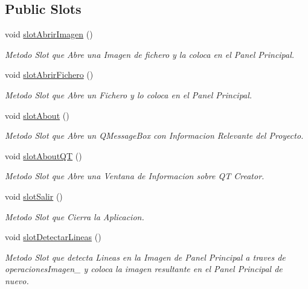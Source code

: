 \subsection*{Public Slots}
\begin{DoxyCompactItemize}
\item 
void \hyperlink{classCAplicacion_ab51359b6a7881206fe6ac46e0ca982f3}{slot\+Abrir\+Imagen} ()
\begin{DoxyCompactList}\small\item\em Metodo Slot que Abre una Imagen de fichero y la coloca en el Panel Principal. \end{DoxyCompactList}\item 
void \hyperlink{classCAplicacion_a3e11d14b05a911fd2e5f5da768787ac2}{slot\+Abrir\+Fichero} ()
\begin{DoxyCompactList}\small\item\em Metodo Slot que Abre un Fichero y lo coloca en el Panel Principal. \end{DoxyCompactList}\item 
void \hyperlink{classCAplicacion_a9ac9b20ed3bd1f2750ee7649ad899f79}{slot\+About} ()
\begin{DoxyCompactList}\small\item\em Metodo Slot que Abre un Q\+Message\+Box con Informacion Relevante del Proyecto. \end{DoxyCompactList}\item 
void \hyperlink{classCAplicacion_a2950d0854e6445bf5159e7a5e65f151d}{slot\+About\+QT} ()
\begin{DoxyCompactList}\small\item\em Metodo Slot que Abre una Ventana de Informacion sobre QT Creator. \end{DoxyCompactList}\item 
void \hyperlink{classCAplicacion_af05758409bf701f83ae66333c25b8464}{slot\+Salir} ()
\begin{DoxyCompactList}\small\item\em Metodo Slot que Cierra la Aplicacion. \end{DoxyCompactList}\item 
void \hyperlink{classCAplicacion_aa7e195e4f06c864cb7c45e626d081b1c}{slot\+Detectar\+Lineas} ()
\begin{DoxyCompactList}\small\item\em Metodo Slot que detecta Lineas en la Imagen de Panel Principal a traves de operaciones\+Imagen\+\_\+ y coloca la imagen resultante en el Panel Principal de nuevo. \end{DoxyCompactList}\item 

\end{DoxyCompactItemize}
